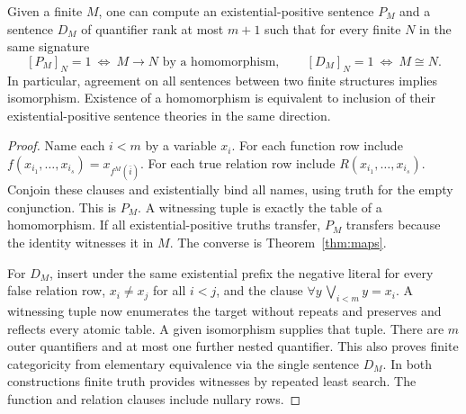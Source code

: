 \begin{theorem}\label{thm:diagrams}
Given a finite $M$, one can compute an existential-positive sentence $P_M$ and a sentence $D_M$ of quantifier rank at most $m+1$ such that for every finite $N$ in the same signature
\[
 [P_M]_N=1\ \Longleftrightarrow\ M\to N\text{ by a homomorphism},\qquad
 [D_M]_N=1\ \Longleftrightarrow\ M\cong N .
\]
In particular, agreement on all sentences between two finite structures implies isomorphism. Existence of a homomorphism is equivalent to inclusion of their existential-positive sentence theories in the same direction.
\end{theorem}
\begin{proof}
Name each $i<m$ by a variable $x_i$. For each function row include $f(x_{i_1},\ldots,x_{i_s})=x_{f^M(\bar i)}$. For each true relation row include $R(x_{i_1},\ldots,x_{i_s})$. Conjoin these clauses and existentially bind all names, using truth for the empty conjunction. This is $P_M$. A witnessing tuple is exactly the table of a homomorphism. If all existential-positive truths transfer, $P_M$ transfers because the identity witnesses it in $M$. The converse is Theorem~\ref{thm:maps}.

For $D_M$, insert under the same existential prefix the negative literal for every false relation row, $x_i\ne x_j$ for all $i<j$, and the clause $\forall y\,\bigvee_{i<m} y=x_i$. A witnessing tuple now enumerates the target without repeats and preserves and reflects every atomic table. A given isomorphism supplies that tuple. There are $m$ outer quantifiers and at most one further nested quantifier. This also proves finite categoricity from elementary equivalence via the single sentence $D_M$. In both constructions finite truth provides witnesses by repeated least search. The function and relation clauses include nullary rows.
\end{proof}


